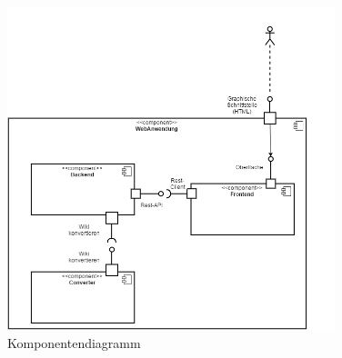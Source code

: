 \label{app:komponentendiagramm}
	
	\begin{figure}[H]
	\begin{center}
	\includegraphics[width=0.85\textwidth]{images/komponentendiagramm}	
	\caption{Komponentendiagramm}	
	\end{center}
	\end{figure}
	